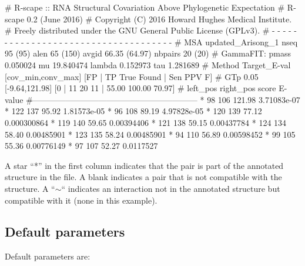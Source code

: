 \begin{sreoutput}
# R-scape :: RNA Structural Covariation Above Phylogenetic Expectation
# R-scape 0.2 (June 2016)
# Copyright (C) 2016 Howard Hughes Medical Institute.
# Freely distributed under the GNU General Public License (GPLv3).
# - - - - - - - - - - - - - - - - - - - - - - - - - - - - - - - - - - - -
# MSA updated_Arisong_1 nseq 95 (95) alen 65 (150) avgid 66.35 (64.97) nbpairs 20 (20)
# GammaFIT: pmass 0.050024 mu 19.840474 lambda 0.152973 tau 1.281689
# Method Target_E-val [cov_min,conv_max] [FP | TP True Found | Sen PPV F] 
# GTp    0.05         [-9.64,121.98]     [0 | 11 20 11 | 55.00 100.00 70.97] 
#       left_pos       right_pos        score   E-value
#------------------------------------------------------------
*	      98	     106	121.98	3.71083e-07
*	     122	     137	95.92	1.81573e-05
*	      96	     108	89.19	4.97828e-05
*	     120	     139	77.12	0.000300864
*	     119	     140	59.65	0.00394406
*	     121	     138	59.15	0.00437784
*	     124	     134	58.40	0.00485901
*	     123	     135	58.24	0.00485901
*	      94	     110	56.89	0.00598452
*	      99	     105	55.36	0.00776149
*	      97	     107	52.27	0.0117527
\end{sreoutput}
A star ``*'' in the first column indicates that the pair is part of
the annotated structure in the  file. A
blank indicates a pair that is not compatible with the structure. A
``$\sim$`` indicates an interaction not in the annotated structure but
compatible with it (none in this example).

\subsection{Default parameters}

Default parameters are:


